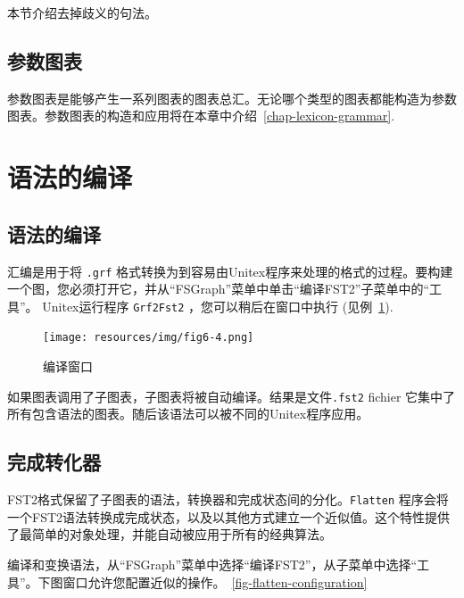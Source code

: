 本节介绍去掉歧义的句法。

\subsection{参数图表}
参数图表是能够产生一系列图表的图表总汇。无论哪个类型的图表都能构造为参数图表。参数图表的构造和应用将在本章中介绍~\ref{chap-lexicon-grammar}.

\section{语法的编译}
\label{section-graph-compilation}
\subsection{语法的编译}
汇编是用于将 \verb+.grf+ 格式转换为到容易由Unitex程序来处理的格式的过程。要构建一个图，您必须打开它，并从“FSGraph”菜单中单击“编译FST2”子菜单中的“工具”。
Unitex运行程序 \verb+Grf2Fst2+ ，您可以稍后在窗口中执行
(见例~\ref{fig-compilation-frame}).

\bigskip
\begin{figure}[!h]
\begin{center}
\texttt{[image: resources/img/fig6-4.png]}
\caption{编译窗口\label{fig-compilation-frame}}
\end{center}
\end{figure}

\noindent 如果图表调用了子图表，子图表将被自动编译。结果是文件\verb+.fst2+ fichier 它集中了所有包含语法的图表。随后该语法可以被不同的Unitex程序应用。


\subsection{完成转化器}
\label{flatten-section}
FST2格式保留了子图表的语法，转换器和完成状态间的分化。\verb+Flatten+ 程序会将一个FST2语法转换成完成状态，以及以其他方式建立一个近似值。这个特性提供了最简单的对象处理，并能自动被应用于所有的经典算法。


\bigskip
\noindent 编译和变换语法，从“FSGraph”菜单中选择“编译FST2”，从子菜单中选择“工具”。下图窗口允许您配置近似的操作。~\ref{fig-flatten-configuration}


